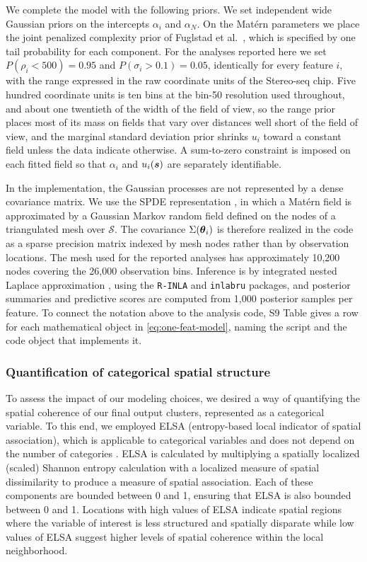 \documentclass[10pt,letterpaper]{article}
\begin{document}
We complete the model with the following priors. We set independent wide Gaussian priors on the intercepts $\alpha_i$ and $\alpha_N$. On the Mat\'ern parameters we place the joint penalized complexity prior of Fuglstad et al.\ \cite{fuglstad2019}, which is specified by one tail probability for each component. For the analyses reported here we set $P(\rho_i < 500) = 0.95$ and $P(\sigma_i > 0.1) = 0.05$, identically for every feature $i$, with the range expressed in the raw coordinate units of the Stereo-seq chip. Five hundred coordinate units is ten bins at the bin-50 resolution used throughout, and about one twentieth of the width of the field of view, so the range prior places most of its mass on fields that vary over distances well short of the field of view, and the marginal standard deviation prior shrinks $u_i$ toward a constant field unless the data indicate otherwise. A sum-to-zero constraint is imposed on each fitted field so that $\alpha_i$ and $u_i(\mbox{\boldmath $s$})$ are separately identifiable.

In the implementation, the Gaussian processes are not represented by a dense covariance matrix. We use the SPDE representation \cite{lindgren2011}, in which a Mat\'ern field is approximated by a Gaussian Markov random field defined on the nodes of a triangulated mesh over $\mathcal{S}$. The covariance $\Sigma(\mbox{\boldmath $\theta$}_i)$ is therefore realized in the code as a sparse precision matrix indexed by mesh nodes rather than by observation locations. The mesh used for the reported analyses has approximately 10{,}200 nodes covering the 26{,}000 observation bins. Inference is by integrated nested Laplace approximation \cite{rue2009}, using the \texttt{R-INLA} and \texttt{inlabru} packages, and posterior summaries and predictive scores are computed from 1{,}000 posterior samples per feature. To connect the notation above to the analysis code, S9 Table gives a row for each mathematical object in \eqref{eq:one-feat-model}, naming the script and the code object that implements it.

\subsubsection*{Quantification of categorical spatial structure}
\label{sec:elsa}

To assess the impact of our modeling choices, we desired a way of quantifying the spatial coherence of our final output clusters, represented as a categorical variable. To this end, we employed ELSA (entropy-based local indicator of spatial association), which is applicable to categorical variables and does not depend on the number of categories \cite{naimi2019elsa}. ELSA is calculated by multiplying a spatially localized (scaled) Shannon entropy calculation with a localized measure of spatial dissimilarity to produce a measure of spatial association. Each of these components are bounded between 0 and 1, ensuring that ELSA is also bounded between 0 and 1. Locations with high values of ELSA indicate spatial regions where the variable of interest is less structured and spatially disparate while low values of ELSA suggest higher levels of spatial coherence within the local neighborhood.
\end{document}

